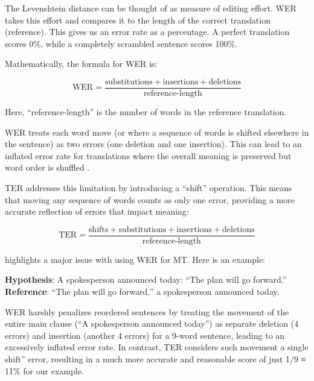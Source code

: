 {{The Levenshtein distance can be thought of as measure of editing effort. WER takes this effort and compares it to the length of the correct translation (reference). This gives us an error rate as a percentage. A perfect translation scores 0\%, while a completely scrambled sentence scores 100\%.

Mathematically, the formula for WER is:

\begin{equation}
\text{WER} = \frac{\text{substitutions} + \text{insertions} + \text{deletions}}{\text{reference-length}}
\end{equation} 

Here, ``reference-length'' is the number of words in the reference translation.

WER treats each word move (or where a sequence of words is shifted elsewhere in the sentence) as two errors (one deletion and one insertion). This can lead to an inflated error rate for translations where the overall meaning is preserved but word order is shuffled \parencite{Rossi2022}.

TER addresses this limitation by introducing a ``shift'' operation. This means that moving any sequence of words counts as only one error, providing a more accurate reflection of errors that impact meaning:

\begin{equation}
\text{TER} = \frac{\text{shifts} + \text{substitutions} + \text{insertions} + \text{deletions}}{\text{reference-length}}
\end{equation} 

\textcite{koehn2020neural} highlights a major issue with using WER for MT. Here is an example:

\begin{boxK}
    \textbf{Hypothesis}: A spokesperson announced today: “The plan will go forward.” \\
    \textbf{Reference}: “The plan will go forward,” a spokesperson announced today.
\end{boxK}

WER harshly penalizes reordered sentences by treating the movement of the entire main clause (``A spokesperson announced today'') as separate deletion (4 errors) and insertion (another 4 errors) for a 9-word sentence, leading to an excessively inflated error rate. In contrast, TER considers such movement a single shift'' error, resulting in a much more accurate and reasonable score of just 1/9 ≈ 11\% for our example.

}}
